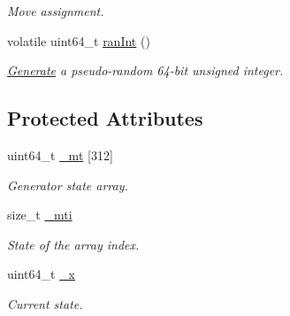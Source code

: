 \begin{DoxyCompactItemize}
\begin{DoxyCompactList}\small\item\em Move assignment. \end{DoxyCompactList}\item 
volatile uint64\+\_\+t \hyperlink{classsamp_files_1_1_generate_m_t_a500e163265b6fdae0a30fdacc1c37f80}{ran\+Int} ()
\begin{DoxyCompactList}\small\item\em \hyperlink{classsamp_files_1_1_generate}{Generate} a pseudo-\/random 64-\/bit unsigned integer. \end{DoxyCompactList}\end{DoxyCompactItemize}
\subsection*{Protected Attributes}
\begin{DoxyCompactItemize}
\item 
\mbox{\label{classsamp_files_1_1_generate_m_t_a41317c198d417a6d4a1d538e62e3bd1d}} 
uint64\+\_\+t \hyperlink{classsamp_files_1_1_generate_m_t_a41317c198d417a6d4a1d538e62e3bd1d}{\+\_\+mt} \mbox{[}312\mbox{]}
\begin{DoxyCompactList}\small\item\em Generator state array. \end{DoxyCompactList}\item 
\mbox{\label{classsamp_files_1_1_generate_m_t_a3ce134726a89493d13a78f8aea0ce0ee}} 
size\+\_\+t \hyperlink{classsamp_files_1_1_generate_m_t_a3ce134726a89493d13a78f8aea0ce0ee}{\+\_\+mti}
\begin{DoxyCompactList}\small\item\em State of the array index. \end{DoxyCompactList}\item 
\mbox{\label{classsamp_files_1_1_generate_m_t_aca8e0fbe5fa5c0312a977dea46ccddec}} 
uint64\+\_\+t \hyperlink{classsamp_files_1_1_generate_m_t_aca8e0fbe5fa5c0312a977dea46ccddec}{\+\_\+x}
\begin{DoxyCompactList}\small\item\em Current state. \end{DoxyCompactList}\end{DoxyCompactItemize}
